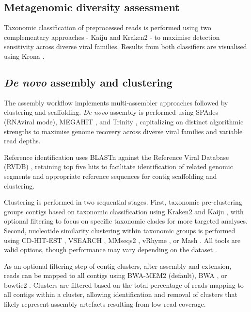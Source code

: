 \subsection{Metagenomic diversity assessment}

Taxonomic classification of preprocessed reads is performed using two complementary approaches - Kaiju \citep{Menzel2016-tz} and Kraken2 \citep{Wood2019-jl} - to maximise detection sensitivity across diverse viral families. Results from both classifiers are visualised using Krona \citep{Ondov2011-yp}.

\subsection{{\it De novo} assembly and clustering}

The assembly workflow implements multi-assembler approaches followed by clustering and scaffolding. \textit{De novo} assembly is performed using SPAdes \citep{Meleshko2021-gb} (RNAviral mode), MEGAHIT \citep{Li2016-sd}, and Trinity \citep{Grabherr2011-ef}, capitalizing on distinct algorithmic strengths to maximise genome recovery across diverse viral families and variable read depths.

Reference identification uses BLASTn \citep{Altschul1990-sy} against the Reference Viral Database (RVDB) \citep{Goodacre2018-dw}, retaining top five hits to facilitate identification of related genomic segments and appropriate reference sequences for contig scaffolding and clustering.

Clustering is performed in two sequential stages. First, taxonomic pre-clustering groups contigs based on taxonomic classification using Kraken2 \citep{Wood2019-jl} and Kaiju \citep{Menzel2016-tz}, with optional filtering to focus on specific taxonomic clades for more targeted analyses. Second, nucleotide similarity clustering within taxonomic groups is performed using CD-HIT-EST \citep{Li2006-nj}, VSEARCH \citep{Rognes2016-ju}, MMseqs2 \citep{Steinegger2017-ci}, vRhyme \citep{Kieft2022-km}, or Mash \citep{Ondov2019-bo}. All tools are valid options, though performance may vary depending on the dataset \citep{Zielezinski2025-vl,Steinegger2017-ci}.

As an optional filtering step of contig clusters, after assembly and extension, reads can be mapped to all contigs using BWA-MEM2 \citep{Vasimuddin2019-rb} (default), BWA \citep{Li2013-pp}, or bowtie2 \citep{Langmead2019-wx}. Clusters are filtered based on the total percentage of reads mapping to all contigs within a cluster, allowing identification and removal of clusters that likely represent assembly artefacts resulting from low read coverage.


